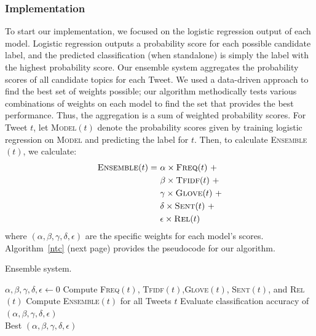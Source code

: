 \documentclass[11pt]{article}
\begin{document}
\subsubsection{Implementation}

To start our implementation, we focused on the logistic regression output of each model. Logistic regression outputs a probability score for each possible candidate label, and the predicted classification (when standalone) is simply the label with the highest probability score. Our ensemble system aggregates the probability scores of all candidate topics for each Tweet. We used a data-driven approach to find the best set of weights possible; our algorithm methodically tests various combinations of weights on each model to find the set that provides the best performance. Thus, the aggregation is a sum of weighted probability scores. For Tweet $t$, let \textsc{Model}$(t)$ denote the probability scores given by training logistic regression on \textsc{Model} and predicting the label for $t$. Then, to calculate \textsc{Ensemble}$(t)$, we calculate:
\begin{align*}
\textsc{Ensemble}(t) =\ &\alpha \times \textsc{Freq}(t)\ +\\
&\beta \times \textsc{Tfidf}(t)\ +\\
&\gamma \times \textsc{Glove}(t)\ +\\
&\delta \times \textsc{Sent}(t)\ +\\
&\epsilon \times \textsc{Rel}(t)
\end{align*}
where $(\alpha,\beta,\gamma,\delta,\epsilon)$ are the specific weights for each model's scores. Algorithm~\ref{ntc} (next page) provides the pseudocode for our algorithm.

\begin{algorithm*}
  \caption{Ensemble system.}\label{ntc}
  \begin{algorithmic}[1]
    \State $\alpha, \beta, \gamma, \delta, \epsilon \gets 0$
      \State Compute \textsc{Freq}$(t)$, \textsc{Tfidf}$(t)$,\textsc{Glove}$(t)$, \textsc{Sent}$(t)$, and \textsc{Rel}$(t)$
    \EndFor
              \State Compute \textsc{Ensemble}$(t)$ for all Tweets $t$
              \State Evaluate classification accuracy of $(\alpha,\beta,\gamma,\delta,\epsilon)$
            \EndFor
          \EndFor
        \EndFor
      \EndFor
    \EndFor\\
    \Return Best $(\alpha,\beta,\gamma,\delta,\epsilon)$
  \end{algorithmic}
\end{algorithm*}
\end{document}
